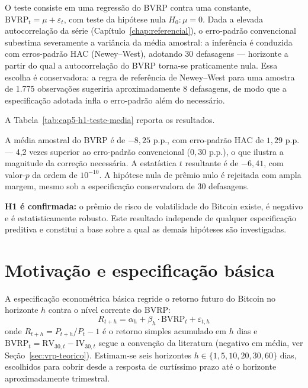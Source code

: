 O teste consiste em uma regressão do BVRP contra uma constante,
$\text{BVRP}_t = \mu + \varepsilon_t$, com teste da hipótese nula
$H_0: \mu = 0$. Dada a elevada autocorrelação da série
(Capítulo~\ref{chap:referencial}), o erro-padrão convencional subestima
severamente a variância da média amostral: a inferência é conduzida com
erros-padrão HAC (Newey--West), adotando 30 defasagens --- horizonte a
partir do qual a autocorrelação do BVRP torna-se praticamente nula. Essa
escolha é conservadora: a regra de referência de Newey--West para uma
amostra de 1.775 observações sugeriria aproximadamente 8 defasagens, de
modo que a especificação adotada infla o erro-padrão além do necessário.

A Tabela~\ref{tab:cap5-h1-teste-media} reporta os resultados.


A média amostral do BVRP é de $-8{,}25$ p.p., com erro-padrão HAC de
$1{,}29$ p.p. --- 4,2 vezes superior ao erro-padrão convencional
($0{,}30$ p.p.), o que ilustra a magnitude da correção necessária. A
estatística $t$ resultante é de $-6{,}41$, com valor-$p$ da ordem de
$10^{-10}$. A hipótese nula de prêmio nulo é rejeitada com ampla margem,
mesmo sob a especificação conservadora de 30 defasagens.

\textbf{H1 é confirmada:} o prêmio de risco de volatilidade do Bitcoin
existe, é negativo e é estatisticamente robusto. Este resultado independe
de qualquer especificação preditiva e constitui a base sobre a qual as
demais hipóteses são investigadas.

\section{Motivação e especificação básica}
\label{sec:cap5-motivacao}

A especificação econométrica básica regride o retorno futuro do Bitcoin no
horizonte $h$ contra o nível corrente do BVRP:
\begin{equation}
R_{t+h} = \alpha_h + \beta_h \cdot \text{BVRP}_t + \varepsilon_{t,h}
\label{eq:cap5-basico}
\end{equation}
onde $R_{t+h} = P_{t+h}/P_t - 1$ é o retorno simples acumulado em
$h$ dias e $\text{BVRP}_t = \text{RV}_{30,t} - \text{IV}_{30,t}$ segue a
convenção da literatura (negativo em média, ver
Seção~\ref{sec:vrp-teorico}). Estimam-se seis horizontes
$h \in \{1, 5, 10, 20, 30, 60\}$ dias, escolhidos para cobrir desde a
resposta de curtíssimo prazo até o horizonte aproximadamente trimestral.

